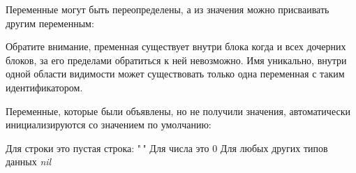 \documentclass{book}
\begin{document}
Переменные могут быть переопределены, а из значения можно присваивать другим переменным:


Обратите внимание, пременная существует внутри блока когда и всех дочерних блоков, за его пределами обратиться к ней невозможно. Имя уникально, внутри одной области видимости может существовать только одна переменная с таким идентификатором.

Переменные, которые были объявлены, но не получили значения, автоматически инициализируются со значением по умолчанию:
\begin{outline}
    \1 Для строки это пустая строка: "\,"
    \1 Для числа это 0
    \1 Для любых других типов данных \textit{nil}
\end{outline}
\end{document}
